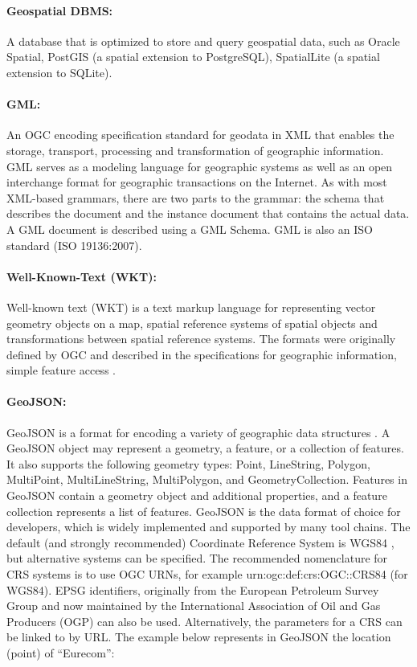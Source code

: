  \paragraph{Geospatial DBMS:}
A database that is optimized to store and query geospatial data, such as Oracle Spatial, PostGIS (a spatial extension to PostgreSQL), SpatialLite (a spatial extension to SQLite). 
 
 \paragraph{GML:}
 An OGC  encoding specification standard for geodata in XML that enables the storage, transport, processing and transformation of geographic information. GML serves as a modeling language for geographic systems as well as an open interchange format for geographic transactions on the Internet. As with most XML-based grammars, there are two parts to the grammar: the schema that describes the document and the instance document that contains the actual data. A GML document is described using a GML Schema. GML is also an ISO standard (ISO 19136:2007). 
 
 \paragraph{Well-Known-Text (WKT):}
 Well-known text (WKT) is a text markup language for representing vector geometry objects on a map, spatial reference systems of spatial objects and transformations between spatial reference systems. The formats were originally defined by OGC and described in the specifications for geographic information, simple feature access \cite{opengis2011}. 
 
 \paragraph{GeoJSON:}
 
GeoJSON is a format for encoding a variety of geographic data structures \cite{geojson}. A GeoJSON object may represent a geometry, a feature, or a collection of features. It also supports the following geometry types: Point, LineString, Polygon, MultiPoint, MultiLineString, MultiPolygon, and GeometryCollection. Features in GeoJSON contain a geometry object and additional properties, and a feature collection represents a list of features. GeoJSON is the data format of choice for developers, which is widely implemented and supported by many tool chains.
The default (and strongly recommended) Coordinate Reference System is WGS84 \cite{wgs84ref}, but alternative systems can be specified. The recommended nomenclature for CRS systems is to use OGC URNs, for example urn:ogc:def:crs:OGC::CRS84 (for WGS84). EPSG identifiers, originally from the European Petroleum Survey Group and now maintained by the International Association of Oil and Gas Producers (OGP) can also be used. Alternatively, the parameters for a CRS can be linked to by URL. 
The example below represents in GeoJSON the location (point) of ``Eurecom'':

